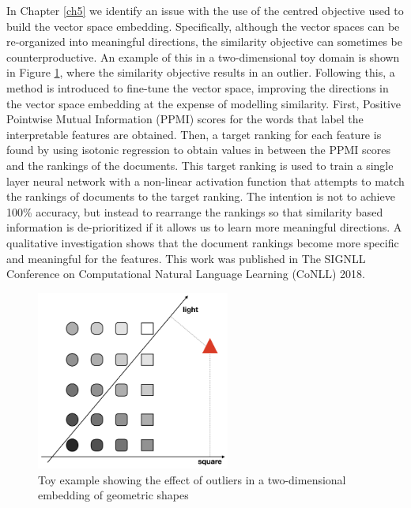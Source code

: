In Chapter \ref{ch5} we identify an issue with the use of the  centred objective used to build the vector space embedding. Specifically, although the vector spaces can be re-organized into meaningful directions, the similarity objective can sometimes be counterproductive. An example of this in a two-dimensional toy domain is shown in Figure \ref{ch1:toyExample}, where the similarity objective results in an outlier. Following this, a method is introduced to fine-tune the vector space, improving the directions in the vector space embedding at the expense of modelling similarity. First, Positive Pointwise Mutual Information (PPMI) scores for the words that label the interpretable features are obtained. Then, a target ranking for each feature is found by using isotonic regression to obtain values in between the PPMI scores and the rankings of the documents. This target ranking is used to train a single layer neural network with a non-linear activation function that attempts to match the rankings of documents to the target ranking. The intention is not to achieve 100\% accuracy, but instead to rearrange the rankings so that similarity based information is de-prioritized if it allows us to learn more meaningful directions.  A qualitative investigation shows that the document rankings become more specific and meaningful for the features. This work was published in The SIGNLL Conference on Computational Natural Language Learning (CoNLL) 2018.

\begin{figure}
	\centering
	\includegraphics[width=180pt]{images/shapes}
	\caption{Toy example showing the effect of outliers in a two-dimensional embedding of geometric shapes}
	\label{ch1:toyExample}
\end{figure}


